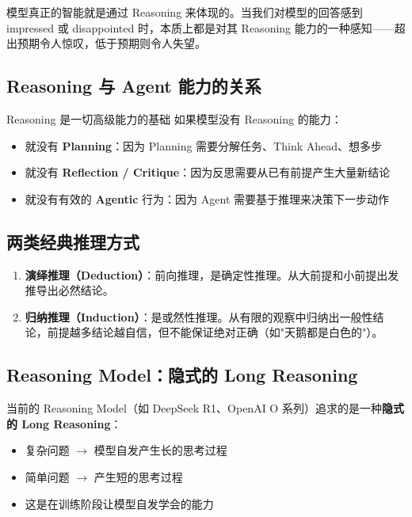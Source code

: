 \documentclass[a4paper]{article}
\begin{document}
模型真正的智能就是通过 Reasoning 来体现的。当我们对模型的回答感到 impressed 或 disappointed 时，本质上都是对其 Reasoning 能力的一种感知——超出预期令人惊叹，低于预期则令人失望。

\subsection{Reasoning 与 Agent 能力的关系}

\begin{knowledgebox}{Reasoning 是一切高级能力的基础}
如果模型没有 Reasoning 的能力：
\begin{itemize}
    \item 就没有 \textbf{Planning}：因为 Planning 需要分解任务、Think Ahead、想多步
    \item 就没有 \textbf{Reflection / Critique}：因为反思需要从已有前提产生大量新结论
    \item 就没有有效的 \textbf{Agentic} 行为：因为 Agent 需要基于推理来决策下一步动作
\end{itemize}
\end{knowledgebox}

\subsection{两类经典推理方式}

\begin{enumerate}
    \item \textbf{演绎推理（Deduction）}：前向推理，是确定性推理。从大前提和小前提出发推导出必然结论。
    \item \textbf{归纳推理（Induction）}：是或然性推理。从有限的观察中归纳出一般性结论，前提越多结论越自信，但不能保证绝对正确（如"天鹅都是白色的"）。
\end{enumerate}

\subsection{Reasoning Model：隐式的 Long Reasoning}

当前的 Reasoning Model（如 DeepSeek R1、OpenAI O 系列）追求的是一种\textbf{隐式的 Long Reasoning}：
\begin{itemize}
    \item 复杂问题 $\rightarrow$ 模型自发产生长的思考过程
    \item 简单问题 $\rightarrow$ 产生短的思考过程
    \item 这是在训练阶段让模型自发学会的能力
\end{itemize}
\end{document}
